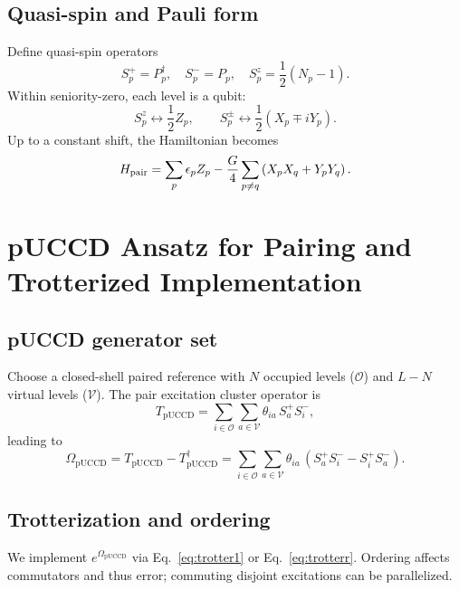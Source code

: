 \documentclass[11pt]{article}
\newcommand{\pUCCD}{\mathrm{pUCCD}}
\begin{document}
\subsection{Quasi-spin and Pauli form}
Define quasi-spin operators
\begin{equation}
  S_p^+=P_p^\dagger,\quad S_p^-=P_p,\quad S_p^z=\frac{1}{2}(N_p-1).
\end{equation}
Within seniority-zero, each level is a qubit:
\begin{equation}
  S_p^z\leftrightarrow \frac{1}{2}Z_p,\qquad S_p^\pm\leftrightarrow \frac{1}{2}(X_p\mp iY_p).
\end{equation}
Up to a constant shift, the Hamiltonian becomes
\begin{equation}
  H_{\rm pair}=\sum_p \epsilon_p Z_p - \frac{G}{4}\sum_{p\neq q}\left(X_pX_q+Y_pY_q\right).
  \label{eq:pairingPauli}
\end{equation}

\section{pUCCD Ansatz for Pairing and Trotterized Implementation}

\subsection{pUCCD generator set}
Choose a closed-shell paired reference with $N$ occupied levels ($\mathcal{O}$) and $L-N$ virtual levels
($\mathcal{V}$). The pair excitation cluster operator is
\begin{equation}
  T_{\pUCCD}=\sum_{i\in\mathcal{O}}\sum_{a\in\mathcal{V}}\theta_{ia}\, S_a^+S_i^-,
\end{equation}
leading to
\begin{equation}
  \Omega_{\pUCCD}=T_{\pUCCD}-T_{\pUCCD}^\dagger
  =\sum_{i\in\mathcal{O}}\sum_{a\in\mathcal{V}}\theta_{ia}\,(S_a^+S_i^- - S_i^+S_a^-).
\end{equation}

\subsection{Trotterization and ordering}
We implement $e^{\Omega_{\pUCCD}}$ via Eq.~\eqref{eq:trotter1} or Eq.~\eqref{eq:trotterr}.
Ordering affects commutators and thus error; commuting disjoint excitations can be parallelized.

\end{document}
